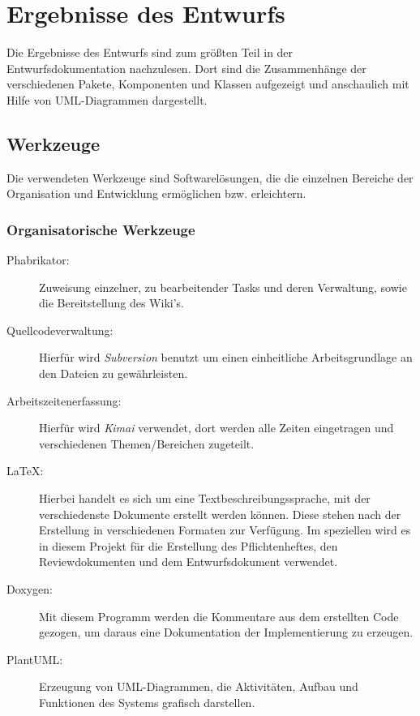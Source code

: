 \documentclass[a4paper, 11pt, ngerman, fleqn]{article}
\begin{document}
\clearpage
	
\section{Ergebnisse des Entwurfs}

Die Ergebnisse des Entwurfs sind zum größten Teil in der Entwurfsdokumentation nachzulesen.
Dort sind die Zusammenhänge der verschiedenen Pakete, Komponenten und Klassen aufgezeigt und anschaulich mit Hilfe von UML-Diagrammen dargestellt.

\subsection{Werkzeuge} 

Die verwendeten Werkzeuge sind Softwarelösungen, die die einzelnen Bereiche der Organisation und Entwicklung ermöglichen bzw. erleichtern.

\subsubsection{Organisatorische Werkzeuge}
	\begin{description}
		\item[Phabrikator:] Zuweisung einzelner, zu bearbeitender Tasks und deren Verwaltung, sowie die Bereitstellung des Wiki's. 
		
		\item[Quellcodeverwaltung:]	Hierfür wird \textit{Subversion} benutzt um einen einheitliche Arbeitsgrundlage an den Dateien zu gewährleisten.
		
		\item[Arbeitszeitenerfassung:] Hierfür wird \textit{Kimai} verwendet, dort werden alle Zeiten eingetragen und verschiedenen Themen/Bereichen zugeteilt.
		
		\item[LaTeX:] Hierbei handelt es sich um eine Textbeschreibungssprache, mit der verschiedenste Dokumente erstellt werden können. 
		Diese stehen nach der Erstellung in verschiedenen Formaten zur Verfügung.
		Im speziellen wird es in diesem Projekt für die Erstellung des Pflichtenheftes, den Reviewdokumenten und dem Entwurfsdokument verwendet.   
		
		\item[Doxygen:] Mit diesem Programm werden die Kommentare aus dem erstellten Code gezogen, um daraus eine Dokumentation der Implementierung zu erzeugen.
		
		\item[PlantUML:] Erzeugung von UML-Diagrammen, die Aktivitäten, Aufbau und Funktionen des Systems grafisch darstellen. 
	\end{description}
\end{document}
